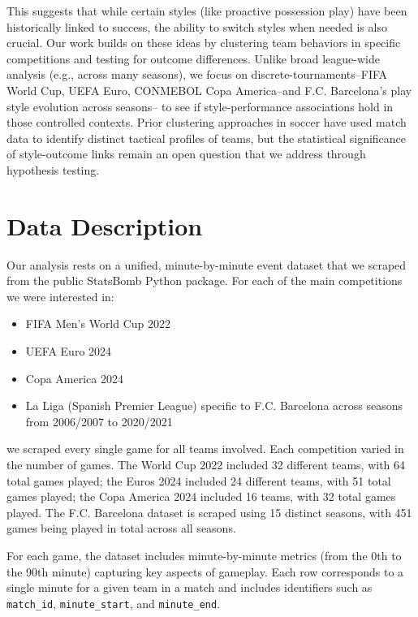 \documentclass[11pt]{article}
\begin{document}
This suggests that while certain styles (like proactive possession play) have been historically linked to success, the ability to switch styles when needed is also crucial. Our work builds on these ideas by clustering team behaviors in specific competitions and testing for outcome differences. Unlike broad league-wide analysis (e.g., across many seasons), we focus on discrete-tournaments--FIFA World Cup, UEFA Euro, CONMEBOL Copa America--and F.C. Barcelona's play style evolution across seasons-- to see if style-performance associations hold in those controlled contexts. Prior clustering approaches in soccer have used match data to identify distinct tactical profiles of teams, but the statistical significance of style-outcome links remain an open question that we address through hypothesis testing. 

\section{Data Description}
Our analysis rests on a unified, minute-by-minute event dataset that we scraped from the public StatsBomb Python package. For each of the main competitions we were interested in:

\begin{itemize}
    \item FIFA Men's World Cup 2022
    \item UEFA Euro 2024
    \item Copa America 2024
    \item La Liga (Spanish Premier League) specific to F.C. Barcelona across seasons from 2006/2007 to 2020/2021
\end{itemize}

we scraped every single game for all teams involved. Each competition varied in the number of games. The World Cup 2022 included 32 different teams, with 64 total games played; the Euros 2024 included 24 different teams, with 51 total games played; the Copa America 2024 included 16 teams, with 32 total games played. The F.C. Barcelona dataset is scraped using 15 distinct seasons, with 451 games being played in total across all seasons. 
\newline

For each game, the dataset includes minute-by-minute metrics (from the 0th to the 90th minute) capturing key aspects of gameplay. Each row corresponds to a single minute for a given team in a match and includes identifiers such as \texttt{match\_id}, \texttt{minute\_start}, and \texttt{minute\_end}.
\end{document}
